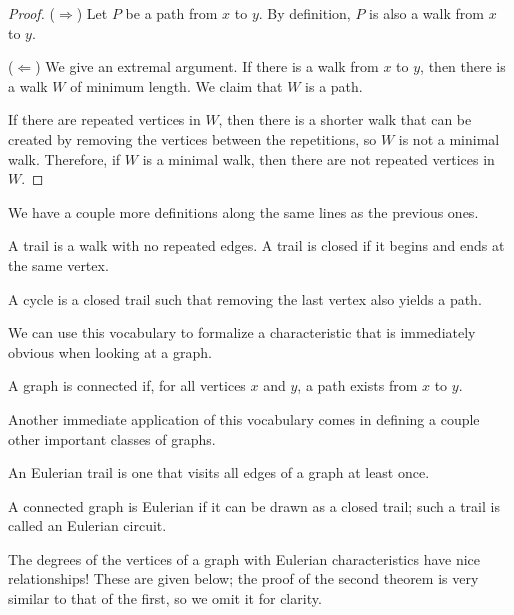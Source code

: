 \documentclass[../m055main.tex]{subfiles}
\begin{document}
\begin{proof}
    ($\Rightarrow$) Let $P$ be a path from $x$ to $y$.
    By definition, $P$ is also a walk from $x$ to $y$.
    \smallskip

    ($\Leftarrow$) We give an extremal argument.
    If there is a walk from $x$ to $y$, then there is a walk $W$ of minimum length.
    We claim that $W$ is a path.

    If there are repeated vertices in $W$, then there is a shorter walk that can be created by removing the vertices between the repetitions, so $W$ is not a minimal walk.
    Therefore, if $W$ is a minimal walk, then there are not repeated vertices in $W$.
\end{proof}

We have a couple more definitions along the same lines as the previous ones.

\begin{definition}[Trail]
    A trail is a walk with no repeated edges.
    A trail is closed if it begins and ends at the same vertex.
\end{definition}

\begin{definition}[Cycle]
    A cycle is a closed trail such that removing the last vertex also yields a path.
\end{definition}

We can use this vocabulary to formalize a characteristic that is immediately obvious when looking at a graph.

\begin{definition}
    A graph is connected if, for all vertices $x$ and $y$, a path exists from $x$ to $y$.
\end{definition}

Another immediate application of this vocabulary comes in defining a couple other important classes of graphs.

\begin{definition}
    An Eulerian trail is one that visits all edges of a graph at least once.

    A connected graph is Eulerian if it can be drawn as a closed trail; such a trail is called an Eulerian circuit.
\end{definition}

The degrees of the vertices of a graph with Eulerian characteristics have nice relationships!
These are given below; the proof of the second theorem is very similar to that of the first, so we omit it for clarity.
\end{document}
